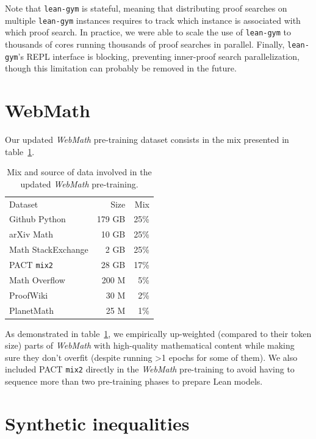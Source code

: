 \documentclass[nohyperref]{article}
\theoremstyle{plain}
\theoremstyle{definition}
\theoremstyle{remark}
\begin{document}
Note that \texttt{lean-gym} is stateful, meaning that distributing proof searches on multiple \texttt{lean-gym} instances requires to track which instance is associated with which proof search. In practice, we were able to scale the use of \texttt{lean-gym} to thousands of cores running thousands of proof searches in parallel. Finally, \texttt{lean-gym}'s REPL interface is blocking, preventing inner-proof search parallelization, though this limitation can probably be removed in the future.

\section{WebMath}
\label{appendix-webmath}

Our updated \textit{WebMath} pre-training dataset consists in the mix presented in table~\ref{table:webmath}.

\begin{table}[t]
\caption{Mix and source of data involved in the updated \textit{WebMath} pre-training.}
\label{table:webmath}
\begin{center}
\begin{small}
\begin{tabular}{lrr}
\toprule
Dataset & Size & Mix \\
\cmidrule(r){1-3}
Github Python & 179 GB & 25\% \\
arXiv Math & 10 GB & 25\% \\
Math StackExchange & 2 GB & 25\% \\
{\sc PACT} \texttt{mix2} & 28 GB & 17\% \\
Math Overflow & 200 M & 5\% \\
ProofWiki & 30 M & 2\% \\
PlanetMath & 25 M & 1\% \\
\bottomrule
\end{tabular}
\end{small}
\end{center}
\end{table}

As demonstrated in table~\ref{table:webmath}, we empirically up-weighted (compared to their token size) parts of \textit{WebMath} with high-quality mathematical content while making sure they don't overfit (despite running >1 epochs for some of them). We also included {\sc PACT} \texttt{mix2} directly in the \textit{WebMath} pre-training to avoid having to sequence more than two pre-training phases to prepare Lean models.

\section{Synthetic inequalities}
\label{appendix-ineq}
\end{document}

